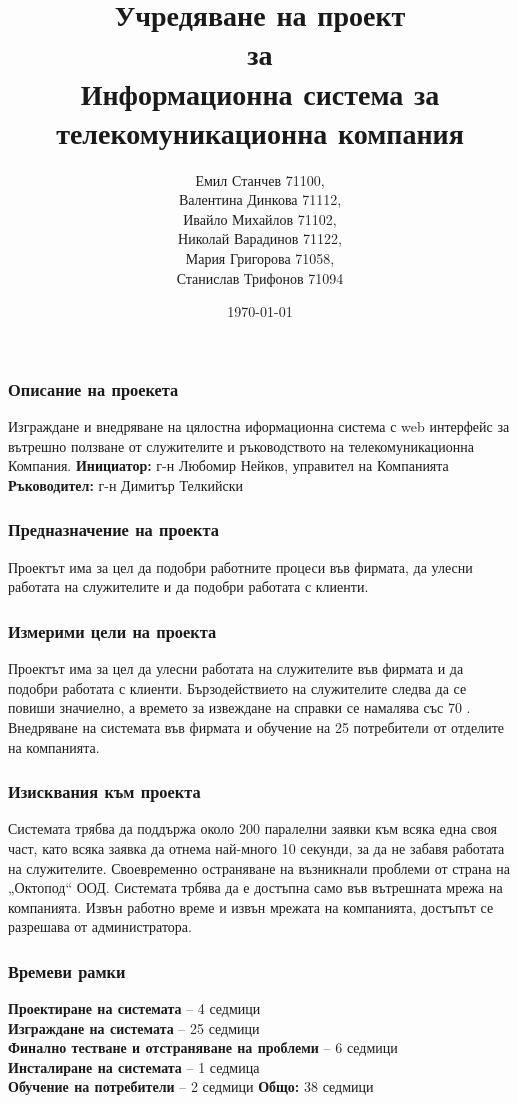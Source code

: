 \documentclass{beamer}
\title[Учредяване на проект за Информационна система за телекомуникационна компания]{Учредяване на проект \\ за \\ Информационна система за телекомуникационна компания}
\author{Емил Станчев 71100,\\
Валентина Динкова 71112,\\
Ивайло Михайлов 71102,\\
Николай Варадинов 71122,\\
Мария Григорова 71058,\\
Станислав Трифонов 71094}
\institute{ФМИ}
\date{\today}
\begin{document}
\begin{frame}
  \titlepage
\end{frame}



\begin{frame}
  \frametitle{Описание на проекета}
Изграждане и внедряване на цялостна иформационна система с web интерфейс за вътрешно ползване 
от служителите и ръководството на телекомуникационна Компания. 
\newline
\newline
\textbf{Инициатор:} г-н Любомир Нейков, управител на Компанията
\textbf{Ръководител:} г-н Димитър Телкийски
\end{frame}


\begin{frame}
  \frametitle{Предназначение на проекта}
Проектът има за цел да подобри  работните процеси във фирмата, да улесни работата на служителите
и да подобри работата с клиенти. 
\end{frame}

\begin{frame}
  \frametitle{Измерими цели на проекта}
Проектът има за цел да улесни работата на служителите във фирмата и да подобри работата с клиенти. 
Бързодействието на служителите следва да се повиши значиелно, а времето за извеждане на справки се 
намалява със 70 \textdiscount .
\newline
\newline
Внедряване на системата във фирмата и обучение на 25 потребители от отделите на компанията.
\end{frame}

\begin{frame}
  \frametitle{Изисквания към проекта}
Системата трябва да поддържа около 200 паралелни заявки към всяка една своя част, като 
всяка заявка да отнема най-много 10 секунди, за да не забавя работата на служителите.
Своевременно остраняване на възникнали проблеми от страна на „Октопод“ ООД.
Системата трбява да е достъпна само във вътрешната мрежа на компанията. 
Извън работно време  и извън мрежата на компанията, достъпът се разрешава от администратора. 
\end{frame}

\begin{frame}
  \frametitle{Времеви рамки}
\textbf{Проектиране на системата} – 4 седмици \\
\textbf{Изграждане на системата} – 25 седмици \\
\textbf{Финално тестване и отстраняване на проблеми} – 6 седмици \\
\textbf{Инсталиране на системата} – 1 седмица \\
\textbf{Обучение на потребители} – 2 седмици
\newline
\newline
\textbf{Общо:} 38 седмици 

\end{frame}
\end{document}

